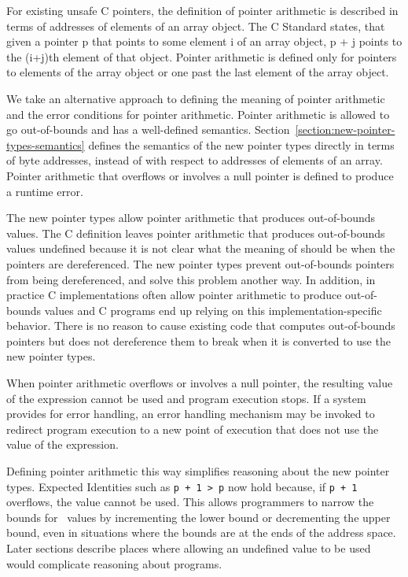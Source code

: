 For existing unsafe C pointers, the definition of pointer arithmetic is
described in terms of addresses of elements of an array object. The C
Standard \cite{ISO2011} states, that given a pointer p that points to some element i of
an array object, p + j points to the (i+j)th element of that object.
Pointer arithmetic is defined only for pointers to elements of the array
object or one past the last element of the array object.

We take an alternative approach to defining the meaning of pointer
arithmetic and the error conditions for pointer arithmetic. Pointer
arithmetic is allowed to go out-of-bounds and has a well-defined
semantics. Section~\ref{section:new-pointer-types-semantics}
defines the semantics of the new pointer types
directly in terms of byte addresses, instead of with respect to
addresses of elements of an array. Pointer arithmetic that overflows or
involves a null pointer is defined to produce a runtime error.

The new pointer types allow pointer arithmetic that produces
out-of-bounds values. The C definition leaves pointer arithmetic that
produces out-of-bounds values undefined because it is not clear what the
meaning of should be when the pointers are dereferenced. The new pointer
types prevent out-of-bounds pointers from being dereferenced, and solve
this problem another way. In addition, in practice C implementations
often allow pointer arithmetic to produce out-of-bounds values and C
programs end up relying on this implementation-specific behavior. There
is no reason to cause existing code that computes out-of-bounds pointers
but does not dereference them to break when it is converted to use the
new pointer types.

When pointer arithmetic overflows or involves a null pointer, the
resulting value of the expression cannot be used and program execution
stops. If a system provides for error handling, an error handling
mechanism may be invoked to redirect program execution to a new point of
execution that does not use the value of the expression.

Defining pointer arithmetic this way simplifies reasoning about the new
pointer types. Expected Identities such as \texttt{p + 1 \textgreater{}
p} now hold because, if \texttt{p + 1} overflows, the value cannot be
used. This allows programmers to narrow the bounds for
\arrayptr\ values by incrementing the lower bound or
decrementing the upper bound, even in situations where the bounds are at
the ends of the address space. Later sections describe places where
allowing an undefined value to be used would complicate reasoning about
programs.

